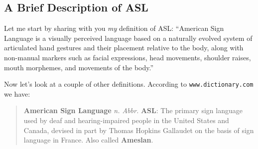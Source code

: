 \documentclass{article}
\begin{document}
\subsection{A Brief Description of ASL}

Let me start by sharing with you \emph{my} definition of ASL:
``American Sign Language is a visually perceived language based on a naturally evolved system of articulated hand gestures and their placement relative to the body, along with non-manual markers such as facial expressions, head movements, shoulder raises, mouth morphemes, and movements of the body.''

Now let's look at a couple of other definitions.
According to \texttt{www.dictionary.com} we have:

\begin{quote}
\textbf{American Sign Language} \textit{n. Abbr.} \textbf{ASL}:
The primary sign language used by deaf and hearing-impaired people in the United States and Canada, devised in part by Thomas Hopkins Gallaudet on the basis of sign language in France.
Also called \textbf{Ameslan}.
\end{quote}
\end{document}
